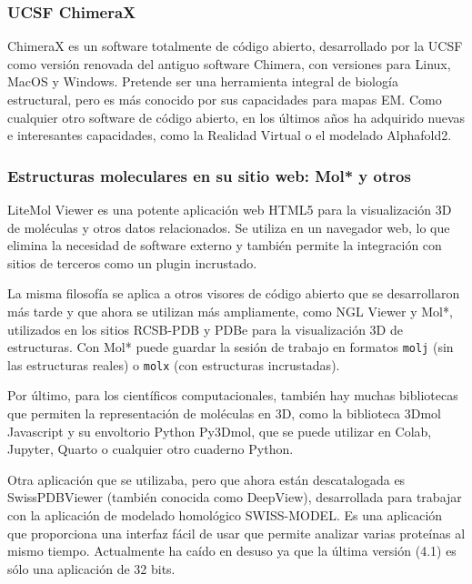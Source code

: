 \subsubsection{UCSF ChimeraX}
ChimeraX es un software totalmente de código abierto, desarrollado por la UCSF como versión renovada del antiguo software Chimera, con versiones para Linux, MacOS y Windows. Pretende ser una herramienta integral de biología estructural, pero es más conocido por sus capacidades para mapas EM. Como cualquier otro software de código abierto, en los últimos años ha adquirido nuevas e interesantes capacidades, como la Realidad Virtual o el modelado Alphafold2.

\subsubsection{Estructuras moleculares en su sitio web: Mol* y otros}
LiteMol Viewer es una potente aplicación web HTML5 para la visualización 3D de moléculas y otros datos relacionados. Se utiliza en un navegador web, lo que elimina la necesidad de software externo y también permite la integración con sitios de terceros como un plugin incrustado. 

La misma filosofía se aplica a otros visores de código abierto que se desarrollaron más tarde y que ahora se utilizan más ampliamente, como NGL Viewer y Mol*, utilizados en los sitios RCSB-PDB y PDBe para la visualización 3D de estructuras. Con Mol* puede guardar la sesión de trabajo en formatos \texttt{molj} (sin las estructuras reales) o \texttt{molx} (con estructuras incrustadas).

Por último, para los científicos computacionales, también hay muchas bibliotecas que permiten la representación de moléculas en 3D, como la biblioteca 3Dmol Javascript y su envoltorio Python Py3Dmol, que se puede utilizar en Colab, Jupyter, Quarto o cualquier otro cuaderno Python.

Otra aplicación que se utilizaba, pero que ahora están descatalogada es SwissPDBViewer (también conocida como DeepView), desarrollada para trabajar con la aplicación de modelado homológico SWISS-MODEL. Es una aplicación que proporciona una interfaz fácil de usar que permite analizar varias proteínas al mismo tiempo. Actualmente ha caído en desuso ya que la última versión (4.1) es sólo una aplicación de 32 bits.

